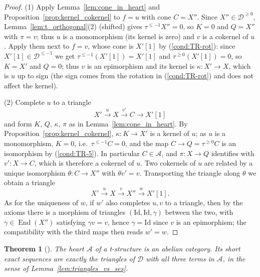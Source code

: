\documentclass[12pt]{amsart}
\newcommand{\condref}[1]{\textup{(\ref{#1})}}
\newtheorem{theorem}{Theorem}
\numberwithin{theorem}{section}
\theoremstyle{definition}
\newcommand{\calA}{\mathcal{A}}
\newcommand{\End}{\operatorname{End}}
\newcommand{\id}{\mathrm{Id}}
\newcommand{\calD}{\mathcal{D}}
\newcommand{\Dle}[1]{\calD^{\leqslant #1}}
\newcommand{\Dge}[1]{\calD^{\geqslant #1}}
\begin{document}
	\begin{proof}
		(1) Apply Lemma~\ref{lem:cone_in_heart} and Proposition~\ref{prop:kernel_cokernel} to $f = u$ with cone $C = X''$.
		Since $X'' \in \Dge{0}$, Lemma~\ref{lem:t_orthogonal}(2) (shifted) gives $\tau^{\leqslant -1} X'' = 0$, so $K = 0$ and $Q = X''$ with $\pi = v$;
		thus $u$ is a monomorphism (its kernel is zero) and $v$ is a cokernel of $u$.
		Apply them next to $f = v$, whose cone is $X'[1]$ by \condref{cond:TR-rot}:
		since $X'[1] \in \Dle{-1}$ we get $\tau^{\leqslant -1}(X'[1]) = X'[1]$ and $\tau^{\geqslant 0}(X'[1]) = 0$, so $K = X'$ and $Q = 0$;
		thus $v$ is an epimorphism and its kernel is $\kappa \colon X' \to X$, which is $u$ up to sign (the sign comes from the rotation in \condref{cond:TR-rot} and does not affect the kernel).
		
		(2) Complete $u$ to a triangle 
		\[
		X' \xrightarrow{u} X \xrightarrow{v'} C \to X'[1]
		\] 
		and form $K$, $Q$, $\kappa$, $\pi$ as in Lemma~\ref{lem:cone_in_heart}.
		By Proposition~\ref{prop:kernel_cokernel}, $\kappa \colon K \to X'$ is a kernel of $u$; as $u$ is a monomorphism, $K = 0$, i.e.\ $\tau^{\leqslant -1} C = 0$, and the map $C \to Q = \tau^{\geqslant 0} C$ is an isomorphism by \condref{cond:TR-5}.
		In particular $C \in \calA$, and $\pi \colon X \to Q$ identifies with $v' \colon X \to C$, which is therefore a cokernel of $u$.
		Two cokernels of $u$ are related by a unique isomorphism $\theta \colon C \to X''$ with $\theta v' = v$.
		Transporting the triangle along $\theta$ we obtain a triangle 
		\[
		X' \xrightarrow{u} X \xrightarrow{v} X'' \xrightarrow{w} X'[1].
		\]
		As for the uniqueness of $w$, if $w'$ also completes $u, v$ to a triangle, then by the axioms there is a morphism of triangles $(\id, \id, \gamma)$ between the two, with $\gamma \in \End(X'')$ satisfying $\gamma v = v$, hence $\gamma = \id$ since $v$ is an epimorphism; the compatibility with the third maps then reads $w' = w$.
	\end{proof}
	
	\begin{theorem}[{\cite[Th\'eor\`eme~1.3.6]{BBD82}}]
		\label{thm:heart_abelian}
		The heart $\calA$ of a t-structure is an abelian category.
		Its short exact sequences are exactly the triangles of $\calD$ with all three terms in $\calA$, in the sense of Lemma~\ref{lem:triangles_vs_ses}.
	\end{theorem}
	
\end{document}
